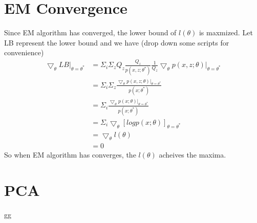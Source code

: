 \documentclass[12pt]{article}
\begin{document}
    \section*{EM Convergence }
    Since EM algorithm has converged, the lower bound of $l(\theta)$ is maxmized.
    Let LB represent the lower bound and we have (drop down some scripts for convenience)
    \begin{equation*}
        \begin{split}
            \bigtriangledown_\theta LB |_{\theta=\theta^*} &= \Sigma_i \Sigma_z Q_z \frac{Q_z}{p(x,z;\theta^*)}\frac{1}{Q_z} \bigtriangledown_\theta p(x,z;\theta) |_{\theta=\theta^*} \\
            &= \Sigma_i \Sigma_z \frac{\bigtriangledown_\theta p(x,z;\theta) |_{\theta=\theta^*}}{p(x;\theta^*)} \\
            &= \Sigma_i \frac{\bigtriangledown_\theta p(x;\theta) |_{\theta=\theta^*}}{p(x;\theta^*)} \\
            &= \Sigma_i \bigtriangledown_\theta [log p(x;\theta)]_{\theta=\theta^*} \\
            &= \bigtriangledown_\theta l(\theta) \\
            &= 0
        \end{split}
    \end{equation*}
    So when EM algorithm has converges, the $l(\theta)$ acheives the maxima.
    

    \section*{PCA}
    gg
\end{document}
